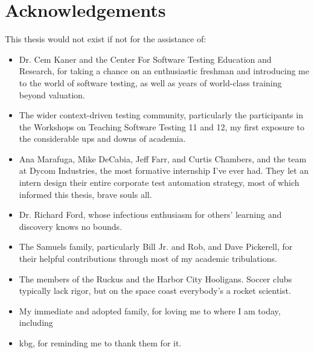 \chapter*{Acknowledgements}
This thesis would not exist if not for the assistance of:
\begin{itemize}
    \item Dr. Cem Kaner and the Center For Software Testing Education and Research, for taking a chance on an enthusiastic freshman and introducing me to the world of software testing, as well as years of world-class training beyond valuation.

    \item The wider context-driven testing community, particularly the participants in the Workshops on Teaching Software Testing 11 and 12, my first exposure to the considerable ups and downs of academia.

    \item Ana Marafuga, Mike DeCabia, Jeff Farr, and Curtis Chambers, and the team at Dycom Industries, the most formative internship I've ever had. They let an intern design their entire corporate test automation strategy, most of which informed this thesis, brave souls all.

    \item Dr. Richard Ford, whose infectious enthusiasm for others' learning and discovery knows no bounds.

    \item The Samuels family, particularly Bill Jr. and Rob, and Dave Pickerell, for their helpful contributions through most of my academic tribulations.

    \item The members of the Ruckus and the Harbor City Hooligans. Soccer clubs typically lack rigor, but on the space coast everybody's a rocket scientist.

    \item My immediate and adopted family, for loving me to where I am today, including

    \item kbg, for reminding me to thank them for it.
\end{itemize}
